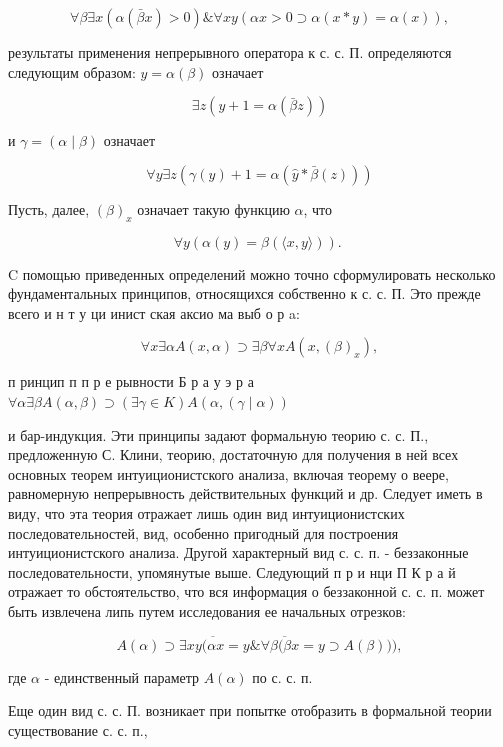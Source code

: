 \documentclass[10pt]{article}
\begin{document}
\[

\forall \beta \exists x(\alpha(\bar{\beta} x)>0) \& \forall x y(\alpha x>0 \supset \alpha(x * y)=\alpha(x)),

\]



результаты применения непрерывного оператора к с. с. П. определяются следующим образом: $y=\alpha(\beta)$ означает



\[

\exists z(y+1=\alpha(\bar{\beta} z))

\]



и $\gamma=(\alpha \mid \beta)$ означает



\[

\forall y \exists z(\gamma(y)+1=\alpha(\hat{y} * \bar{\beta}(z)))

\]



Пусть, далее, $(\beta)_{x}$ означает такую функцию $\alpha$, что



\[

\forall y(\alpha(y)=\beta(\langle x, y\rangle)) \text {. }

\]



C помощью приведенных определений можно точно сформулировать несколько фундаментальных принципов, относящихся собственно к с. с. П. Это прежде всего и н т у ци инист ская аксио ма выб о р a:



\[

\forall x \exists \alpha A(x, \alpha) \supset \exists \beta \forall x A\left(x,(\beta)_{x}\right),

\]



п ринцип п п р е рывности Б р а у э р а $\forall \alpha \exists \beta A(\alpha, \beta) \supset(\exists \gamma \in K) A(\alpha,(\gamma \mid \alpha))$



и бар-индукция. Эти принципы задают формальную теорию с. с. П., предложенную С. Клини, теорию, достаточную для получения в ней всех основных теорем интуиционистского анализа, включая теорему о веере, равномерную непрерывность действительных функций и др. Следует иметь в виду, что эта теория отражает лишь один вид интуиционистских последовательностей, вид, особенно пригодный для построения интуиционистского анализа. Другой характерный вид с. с. п. - беззаконные последовательности, упомянутые выше. Следующий п р и нци П К р а й отражает то обстоятельство, что вся информация о беззаконной с. с. п. может быть извлечена липь путем исследования ее начальных отрезков:



\[

A(\alpha) \supset \exists x y \overline{(\alpha x}=y \& \forall \beta \overline{(\beta} x=y \supset A(\beta))),

\]



где $\alpha$ - единственный параметр $A(\alpha)$ по с. с. п.



Еще один вид с. с. П. возникает при попытке отобразить в формальной теории существование с. с. п.,
\end{document}
